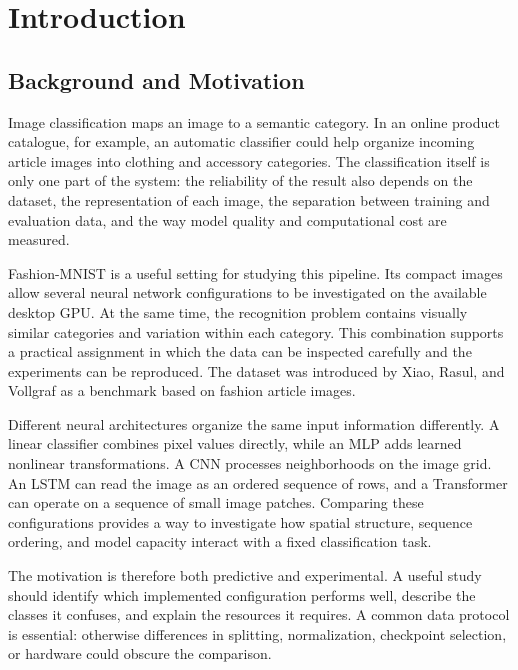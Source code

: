 \section{Introduction}
\label{sec:introduction}

\subsection{Background and Motivation}
Image classification maps an image to a semantic category. In an online product
catalogue, for example, an automatic classifier could help organize incoming
article images into clothing and accessory categories. The classification itself
is only one part of the system: the reliability of the result also depends on
the dataset, the representation of each image, the separation between training
and evaluation data, and the way model quality and computational cost are measured.

Fashion-MNIST is a useful setting for studying this pipeline. Its compact images
allow several neural network configurations to be investigated on the available
desktop GPU. At the same time, the recognition problem contains visually similar
categories and variation within each category. This combination supports a
practical assignment in which the data can be inspected carefully and the
experiments can be reproduced. The dataset was introduced by Xiao, Rasul, and
Vollgraf as a benchmark based on fashion article images\cite{xiao2017}.

Different neural architectures organize the same input information differently.
A linear classifier combines pixel values directly, while an MLP adds learned
nonlinear transformations. A CNN processes neighborhoods on the image grid.
An LSTM can read the image as an ordered sequence of rows, and a Transformer
can operate on a sequence of small image patches. Comparing these configurations
provides a way to investigate how spatial structure, sequence ordering, and
model capacity interact with a fixed classification task.

The motivation is therefore both predictive and experimental. A useful study
should identify which implemented configuration performs well, describe the
classes it confuses, and explain the resources it requires. A common data
protocol is essential: otherwise differences in splitting, normalization,
checkpoint selection, or hardware could obscure the comparison.

